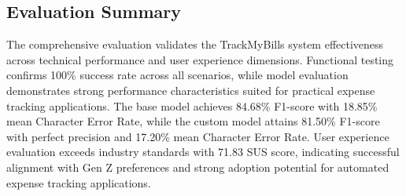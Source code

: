 \subsection{Evaluation Summary}
The comprehensive evaluation validates the TrackMyBills system effectiveness across technical performance and user experience dimensions. Functional testing confirms 100\% success rate across all scenarios, while model evaluation demonstrates strong performance characteristics suited for practical expense tracking applications. The base model achieves 84.68\% F1-score with 18.85\% mean Character Error Rate, while the custom model attains 81.50\% F1-score with perfect precision and 17.20\% mean Character Error Rate. User experience evaluation exceeds industry standards with 71.83 SUS score, indicating successful alignment with Gen Z preferences and strong adoption potential for automated expense tracking applications.